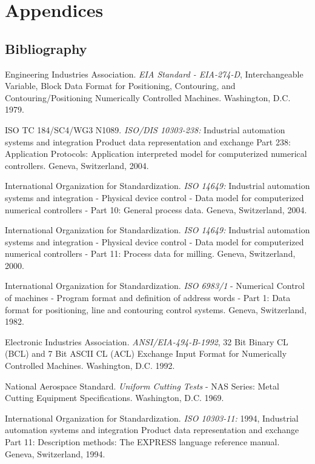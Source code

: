 \documentclass{mtconnect}	%
\begin{document}
\appendix
\section*{Appendices}
\renewcommand{\thesubsection}{\Alph{subsection}}
\lstset{language=xml,numbers=left,xleftmargin=2em}

\subsection{Bibliography}

Engineering Industries Association. \textit{EIA Standard - EIA-274-D}, Interchangeable Variable, Block Data Format for Positioning, Contouring, and Contouring/Positioning Numerically Controlled Machines. Washington, D.C. 1979.

ISO TC 184/SC4/WG3 N1089. \textit{ISO/DIS 10303-238:} Industrial automation systems and integration  Product data representation and exchange  Part 238: Application Protocols: Application interpreted model for computerized numerical controllers. Geneva, Switzerland, 2004.

International Organization for Standardization. \textit{ISO 14649:} Industrial automation systems and integration - Physical device control - Data model for computerized numerical controllers - Part 10: General process data. Geneva, Switzerland, 2004.

International Organization for Standardization. \textit{ISO 14649:} Industrial automation systems and integration - Physical device control - Data model for computerized numerical controllers - Part 11: Process data for milling. Geneva, Switzerland, 2000.

International Organization for Standardization. \textit{ISO 6983/1} - Numerical Control of machines - Program format and definition of address words - Part 1: Data format for positioning, line and contouring control systems. Geneva, Switzerland, 1982.

Electronic Industries Association. \textit{ANSI/EIA-494-B-1992}, 32 Bit Binary CL (BCL) and 7 Bit ASCII CL (ACL) Exchange Input Format for Numerically Controlled Machines. Washington, D.C. 1992.

National Aerospace Standard. \textit{Uniform Cutting Tests} - NAS Series: Metal Cutting Equipment Specifications. Washington, D.C. 1969.

International Organization for Standardization. \textit{ISO 10303-11:} 1994, Industrial automation systems and integration  Product data representation and exchange  Part 11: Description methods: The EXPRESS language reference manual. Geneva, Switzerland, 1994.
\end{document}
